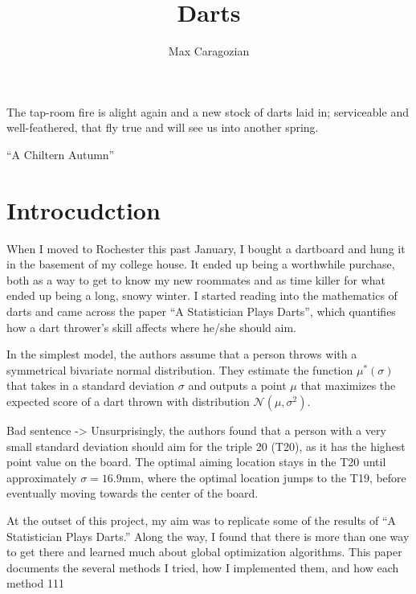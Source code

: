 \documentclass[]{article}
\title{Darts}
\author{Max Caragozian}
\begin{document}
\maketitle


\epigraph{The tap-room fire is alight again and a new stock of darts laid in; serviceable and well-feathered, that fly true and will see us into another spring.}{``A Chiltern Autumn'' \cite{1929spectator}}

\section{Introcudction}
When I moved to Rochester this past January, I bought a dartboard and hung it in the basement of my college house. It ended up being a worthwhile purchase, both as a way to get to know my new roommates and as time killer for what ended up being a long, snowy winter. I started reading into the mathematics of darts and came across the paper ``A Statistician Plays Darts''\cite{stat},  which quantifies how a dart thrower's skill affects where he/she should aim. 

In the simplest model, the authors assume that a person throws with a symmetrical bivariate normal distribution. They estimate the function $\mu^*(\sigma)$ that takes in a standard deviation $\sigma$ and outputs a point $\mu$ that maximizes the expected score of a dart thrown with distribution $\mathcal{N}(\mu, \sigma^2)$.

Bad sentence -> Unsurprisingly, the authors found that a person with a very small standard deviation should aim for the triple 20 (T20), as it has the highest point value on the board. The optimal aiming location stays in the T20 until approximately $\sigma=16.9$mm, where the optimal location jumps to the T19, before eventually moving towards the center of the board.

At the outset of this project, my aim was to replicate some of the results of ``A Statistician Plays Darts.''\cite{stat} Along the way, I found that there is more than one way to get there and learned much about global optimization algorithms. This paper documents the several methods I tried, how I implemented them, and how each method 111
\end{document}
